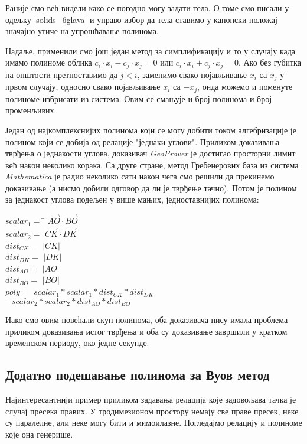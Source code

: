 Раније смо већ видели како се погодно могу задати тела. О томе смо
писали у одељку \ref{solids_6glava} и управо избор да тела ставимо у
канонски положај значајно утиче на упрошћавање полинома.

Надаље, применили смо још један метод за симплификацију и то у
случају када имамо полиноме облика $c_i\cdot x_i - c_j\cdot x_j =
0$ или $c_i\cdot x_i + c_j\cdot x_j = 0$. Ако без губитка на
општости претпоставимо да $j < i$, заменимо свако појављивање $x_i$ са
$x_j$ у првом случају, односно свако појављивање $x_i$ са $-x_j$, онда
можемо и поменуте полиноме избрисати из система. Овим се смањује и број
полинома и број променљивих.

Један од најкомплекснијих полинома који се могу добити током
алгебризације је полином који се добија од релације "једнаки
углови". Приликом доказивања тврђења о једнакости углова, доказивач
\emph{GeoProver} је достигао просторни лимит већ након неколико
корака. Са друге стране, метод Гребенерових база из система
\emph{Mathematica} је радио неколико сати након чега смо решили да
прекинемо доказивање (а нисмо добили одговор да ли је тврђење
тачно). Потом је полином за једнакост углова подељен у више мањих,
једноставнијих полинома:
\begin{tabbing}
$scalar_1 =$ \=  $\overrightarrow{AO} \cdot \overrightarrow{BO}$  \\
$scalar_2 =$ \> $\overrightarrow{CK} \cdot \overrightarrow{DK}$ \\
$dist_{CK} =$   \> $|CK|$ \\
$dist_{DK} =$   \> $|DK|$ \\
$dist_{AO} =$   \> $|AO|$ \\
$dist_{BO} =$   \> $|BO|$ \\
$poly =$ \> $scalar_1*scalar_1*dist_{CK}*dist_{DK}$ \\
         \> $- scalar_2*scalar_2*dist_{AO}*dist_{BO}$
\end{tabbing}

Иако смо овим повећали скуп полинома, оба доказивача нису имала
проблема приликом доказивања истог тврђења и оба су доказивање
завршили у кратком временском периоду, око једне секунде.

\subsection{Додатно подешавање полинома за Вуов метод}
\label{presekPravih_6glava}

Најинтересантнији пример приликом задавања релација које задовољава
тачка је случај пресека правих. У тродимезионом простору немају све
праве пресек, неке су паралелне, али неке могу бити и
мимоилазне. Погледајмо релацију и полиноме које она генерише.

